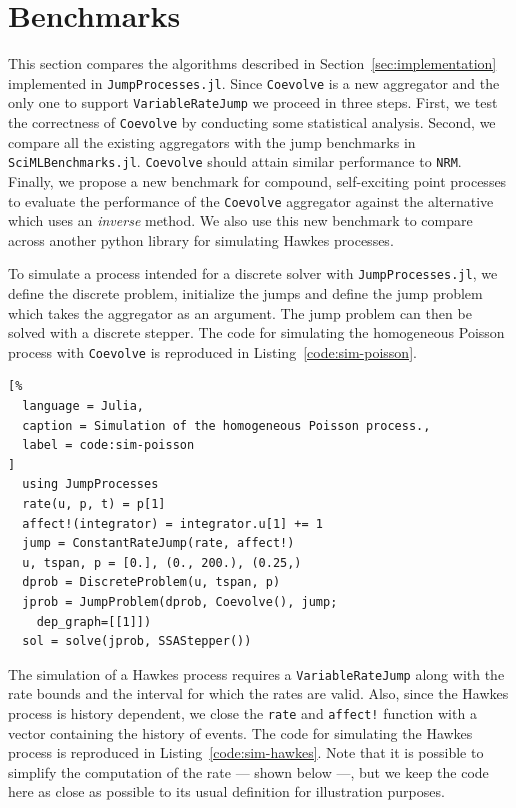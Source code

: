 \documentclass{juliacon}
\begin{document}
\section{Benchmarks} \label{sec:benchmarks}

This section compares the algorithms described in Section~\ref{sec:implementation} implemented in \texttt{JumpProcesses.jl}. Since \texttt{Coevolve} is a new aggregator and the only one to support \texttt{VariableRateJump} we proceed in three steps. First, we test the correctness of \texttt{Coevolve} by conducting some statistical analysis. Second, we compare all the existing aggregators with the jump benchmarks in \texttt{SciMLBenchmarks.jl}. \texttt{Coevolve} should attain similar performance to \texttt{NRM}. Finally, we propose a new benchmark for compound, self-exciting point processes to evaluate the performance of the \texttt{Coevolve} aggregator against the alternative which uses an \textit{inverse} method. We also use this new benchmark to compare across another python library for simulating Hawkes processes.

To simulate a process intended for a discrete solver with \texttt{JumpProcesses.jl}, we define the discrete problem, initialize the jumps and define the jump problem which takes the aggregator as an argument. The jump problem can then be solved with a discrete stepper. The code for simulating the homogeneous Poisson process with \texttt{Coevolve} is reproduced in Listing~\ref{code:sim-poisson}.

\begin{lstlisting}[%
  language = Julia,
  caption = Simulation of the homogeneous Poisson process.,
  label = code:sim-poisson
]
  using JumpProcesses
  rate(u, p, t) = p[1]
  affect!(integrator) = integrator.u[1] += 1
  jump = ConstantRateJump(rate, affect!)
  u, tspan, p = [0.], (0., 200.), (0.25,)
  dprob = DiscreteProblem(u, tspan, p)
  jprob = JumpProblem(dprob, Coevolve(), jump;
    dep_graph=[[1]])
  sol = solve(jprob, SSAStepper())
\end{lstlisting}

The simulation of a Hawkes process requires a \texttt{VariableRateJump} along with the rate bounds and the interval for which the rates are valid. Also, since the Hawkes process is history dependent, we close the \texttt{rate} and \texttt{affect!} function with a vector containing the history of events. The code for simulating the Hawkes process is reproduced in Listing~\ref{code:sim-hawkes}. Note that it is possible to simplify the computation of the rate --- shown below ---, but we keep the code here as close as possible to its usual definition for illustration purposes.
\end{document}
